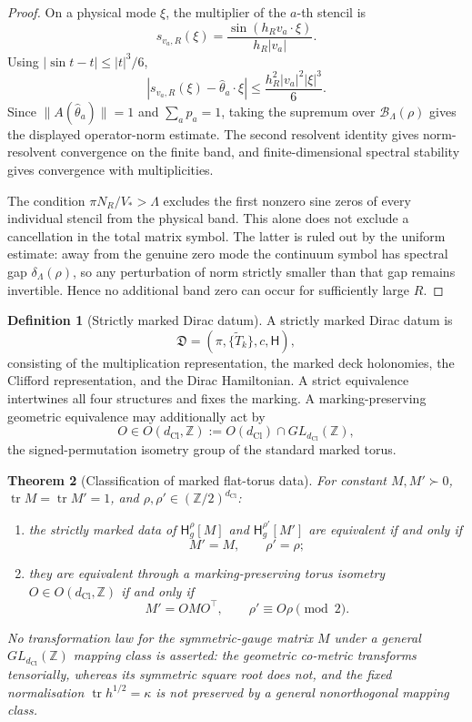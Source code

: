 \documentclass[11pt]{article}
\newtheorem{theorem}{Theorem}[section]
\theoremstyle{definition}
\newtheorem{definition}[theorem]{Definition}
\theoremstyle{remark}
\newcommand{\Z}{\mathbb{Z}}
\newcommand{\Ztwo}{\mathbb{Z}/2}
\newcommand{\dCl}{d_{\mathrm{Cl}}}
\newcommand{\tr}{\operatorname{tr}}
\newcommand{\Ham}{\mathsf{H}}
\begin{document}
\begin{proof}
On a physical mode \(\xi\), the multiplier of the \(a\)-th stencil is
\[
  s_{v_a,R}(\xi)
  =
  \frac{\sin(h_Rv_a\cdot\xi)}{h_R|v_a|}.
\]
Using \(|\sin t-t|\le |t|^3/6\),
\[
 \left|
 s_{v_a,R}(\xi)-\hat\theta_a\cdot\xi
 \right|
 \le
 \frac{h_R^2|v_a|^2|\xi|^3}{6}.
\]
Since \(\|A(\hat\theta_a)\|=1\) and \(\sum_ap_a=1\), taking the supremum over
\(\mathcal B_\Lambda(\rho)\) gives the displayed operator-norm estimate.  The
second resolvent identity gives norm-resolvent convergence on the finite band,
and finite-dimensional spectral stability gives convergence with
multiplicities.

The condition \(\pi N_R/V_*>\Lambda\) excludes the first nonzero sine zeros of
every individual stencil from the physical band.  This alone does not exclude
a cancellation in the total matrix symbol.  The latter is ruled out by the
uniform estimate: away from the genuine zero mode the continuum symbol has
spectral gap \(\delta_\Lambda(\rho)\), so any perturbation of norm strictly
smaller than that gap remains invertible.  Hence no additional band zero can
occur for sufficiently large \(R\).
\end{proof}

\begin{definition}[Strictly marked Dirac datum]
\label{def:strictly-marked-dirac-datum}
A strictly marked Dirac datum is
\[
  \mathfrak D=(\pi,\{\widetilde T_k\},c,\Ham),
\]
consisting of the multiplication representation, the marked deck holonomies,
the Clifford representation, and the Dirac Hamiltonian.  A strict equivalence
intertwines all four structures and fixes the marking.  A marking-preserving
geometric equivalence may additionally act by
\[
  O\in O(\dCl,\Z):=O(\dCl)\cap GL_{\dCl}(\Z),
\]
the signed-permutation isometry group of the standard marked torus.
\end{definition}

\begin{theorem}[Classification of marked flat-torus data]
\label{thm:marked-torus-classification}
For constant \(M,M'\succ0\), \(\tr M=\tr M'=1\), and
\(\rho,\rho'\in(\Ztwo)^{\dCl}\):
\begin{enumerate}
\item the strictly marked data of \(\Ham^\rho_g[M]\) and
      \(\Ham^{\rho'}_g[M']\) are equivalent if and only if
      \[
        M'=M,\qquad \rho'=\rho;
      \]
\item they are equivalent through a marking-preserving torus isometry
      \(O\in O(\dCl,\Z)\) if and only if
      \[
        M'=OMO^\top,\qquad \rho'\equiv O\rho\pmod2.
      \]
\end{enumerate}
No transformation law for the symmetric-gauge matrix \(M\) under a general
\(GL_{\dCl}(\Z)\) mapping class is asserted: the geometric co-metric transforms
tensorially, whereas its symmetric square root does not, and the fixed
normalisation \(\tr h^{1/2}=\kappa\) is not preserved by a general nonorthogonal
mapping class.
\end{theorem}
\end{document}

